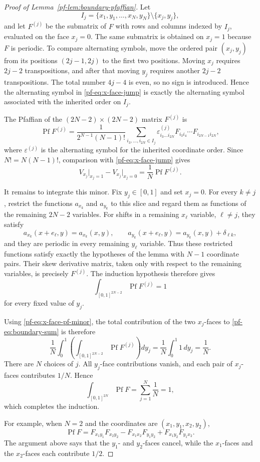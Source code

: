\documentclass[11pt,reqno]{amsart}
\numberwithin{equation}{section}
\theoremstyle{definition}
\theoremstyle{remark}
\newcommand{\Pf}{\operatorname{Pf}}
\begin{document}
\begin{proof}[Proof of Lemma~\ref{pf-lem:boundary-pfaffian}]
Let
\[
 I_j=\{x_1,y_1,\ldots,x_N,y_N\}\setminus\{x_j,y_j\},
\]
and let $F^{(j)}$ be the submatrix of $F$ with rows and columns indexed by
$I_j$, evaluated on the face $x_j=0$.  The same submatrix is obtained on
$x_j=1$ because $F$ is periodic.  To compare alternating symbols, move the
ordered pair $(x_j,y_j)$ from its positions $(2j-1,2j)$ to the first two
positions.  Moving $x_j$ requires $2j-2$ transpositions, and after that
moving $y_j$ requires another $2j-2$ transpositions.  The total number
$4j-4$ is even, so no sign is introduced.  Hence the alternating symbol in
\eqref{pf-eq:x-face-jump} is exactly the alternating symbol associated with
the inherited order on $I_j$.

The Pfaffian of the $(2N-2)\times(2N-2)$ matrix $F^{(j)}$ is
\[
 \Pf F^{(j)}
 =\frac{1}{2^{N-1}(N-1)!}
 \sum_{i_3,\ldots,i_{2N}\in I_j}
 \varepsilon^{(j)}_{i_3\ldots i_{2N}}
 F_{i_3i_4}\cdots F_{i_{2N-1}i_{2N}},
\]
where $\varepsilon^{(j)}$ is the alternating symbol for the inherited
coordinate order.  Since $N!=N(N-1)!$, comparison with
\eqref{pf-eq:x-face-jump} gives
\begin{equation}\label{pf-eq:x-face-pf-minor}
 V_{x_j}\big|_{x_j=1}-V_{x_j}\big|_{x_j=0}
 =\frac1N\Pf F^{(j)}.
\end{equation}

It remains to integrate this minor.  Fix $y_j\in[0,1]$ and set $x_j=0$.
For every $k\ne j$, restrict the functions $a_{x_k}$ and $a_{y_k}$ to this
slice and regard them as functions of the remaining $2N-2$ variables.
For shifts in a remaining $x_\ell$ variable, $\ell\ne j$, they satisfy
\[
 a_{x_k}(x+e_\ell,y)=a_{x_k}(x,y),
 \qquad
 a_{y_k}(x+e_\ell,y)=a_{y_k}(x,y)+\delta_{\ell k},
\]
and they are periodic in every remaining $y_\ell$ variable.  Thus these
restricted functions satisfy exactly the hypotheses of the lemma with
$N-1$ coordinate pairs.  Their skew derivative matrix, taken only with
respect to the remaining variables, is precisely $F^{(j)}$.  The induction
hypothesis therefore gives
\begin{equation}\label{pf-eq:minor-integral}
 \int_{[0,1]^{2N-2}}\Pf F^{(j)}=1
\end{equation}
for every fixed value of $y_j$.

Using \eqref{pf-eq:x-face-pf-minor}, the total contribution of the two
$x_j$-faces to \eqref{pf-eq:boundary-sum} is therefore
\[
 \frac1N\int_0^1
 \left(\int_{[0,1]^{2N-2}}\Pf F^{(j)}\right)dy_j
 =\frac1N\int_0^1 1\,dy_j
 =\frac1N.
\]
There are $N$ choices of $j$.  All $y_j$-face contributions vanish, and
each pair of $x_j$-faces contributes $1/N$.  Hence
\[
 \int_{[0,1]^{2N}}\Pf F
 =\sum_{j=1}^N\frac1N=1,
\]
which completes the induction.

For example, when $N=2$ and the coordinates are
$(x_1,y_1,x_2,y_2)$,
\[
 \Pf F
 =F_{x_1y_1}F_{x_2y_2}
  -F_{x_1x_2}F_{y_1y_2}
  +F_{x_1y_2}F_{y_1x_2}.
\]
The argument above says that the $y_1$- and $y_2$-faces cancel, while the
$x_1$-faces and the $x_2$-faces each contribute $1/2$.
\end{proof}
\end{document}
